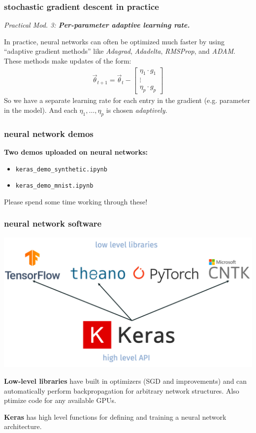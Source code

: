 \documentclass[handout,compress]{beamer}
\begin{document}
	\begin{frame}
	\frametitle{stochastic gradient descent in practice}
	\emph{Practical Mod. 3: \textbf{Per-parameter adaptive learning rate.}}
	
	
	In practice, neural networks can often be optimized much faster by using ``adaptive gradient methods'' like \emph{Adagrad}, \emph{Adadelta}, \emph{RMSProp}, and \alert{\emph{ADAM}}. These methods make updates of the form:
	\begin{align*}
	\vec{\theta}_{t+1} = \vec{\theta}_{t} - \begin{bmatrix}\eta_1 \cdot g_1\\\vdots\\\eta_p\cdot g_p\end{bmatrix}
	\end{align*}
	So we have a separate learning rate for each entry in the gradient (e.g. parameter in the model). And each $\eta_1, \ldots, \eta_p$ is chosen \emph{adaptively.}
\end{frame}
	
	\begin{frame}
		\frametitle{neural network demos}
		\textbf{Two demos uploaded on neural networks:}
		\begin{itemize}
			\item \texttt{keras\_demo\_synthetic.ipynb}
			\item \texttt{keras\_demo\_mnist.ipynb}
		\end{itemize}
		\begin{center}
			Please spend some time working through these!
		\end{center}
	\end{frame}

	\begin{frame}
	\frametitle{neural network software}
	\small
	\begin{center}
		\includegraphics[width=.9\textwidth]{neural_net_zoo.png}
	\end{center}
	\vspace{-1em}

	\textbf{Low-level libraries} have built in optimizers (SGD and improvements) and can automatically perform backpropagation for arbitrary network structures. Also ptimize code for any available GPUs.
	
	\textbf{Keras} has high level functions for defining and training a neural network architecture.
	\end{frame}
	
\end{document}
